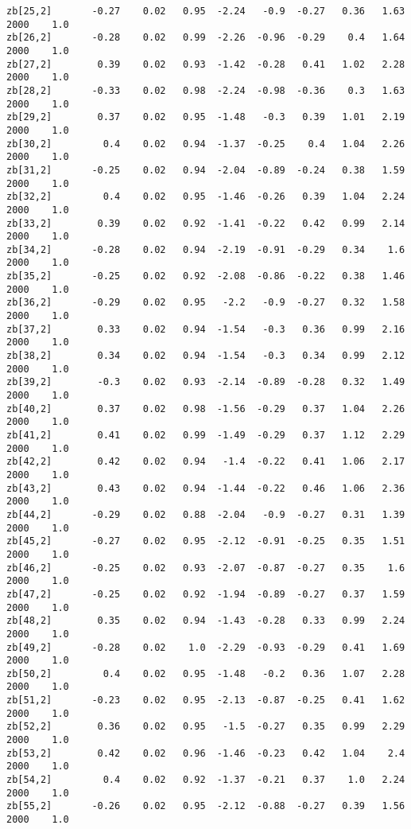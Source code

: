 \documentclass[11pt]{article}
\begin{document}
\begin{Verbatim}[commandchars=\\\{\}]
zb[25,2]       -0.27    0.02   0.95  -2.24   -0.9  -0.27   0.36   1.63   2000    1.0
zb[26,2]       -0.28    0.02   0.99  -2.26  -0.96  -0.29    0.4   1.64   2000    1.0
zb[27,2]        0.39    0.02   0.93  -1.42  -0.28   0.41   1.02   2.28   2000    1.0
zb[28,2]       -0.33    0.02   0.98  -2.24  -0.98  -0.36    0.3   1.63   2000    1.0
zb[29,2]        0.37    0.02   0.95  -1.48   -0.3   0.39   1.01   2.19   2000    1.0
zb[30,2]         0.4    0.02   0.94  -1.37  -0.25    0.4   1.04   2.26   2000    1.0
zb[31,2]       -0.25    0.02   0.94  -2.04  -0.89  -0.24   0.38   1.59   2000    1.0
zb[32,2]         0.4    0.02   0.95  -1.46  -0.26   0.39   1.04   2.24   2000    1.0
zb[33,2]        0.39    0.02   0.92  -1.41  -0.22   0.42   0.99   2.14   2000    1.0
zb[34,2]       -0.28    0.02   0.94  -2.19  -0.91  -0.29   0.34    1.6   2000    1.0
zb[35,2]       -0.25    0.02   0.92  -2.08  -0.86  -0.22   0.38   1.46   2000    1.0
zb[36,2]       -0.29    0.02   0.95   -2.2   -0.9  -0.27   0.32   1.58   2000    1.0
zb[37,2]        0.33    0.02   0.94  -1.54   -0.3   0.36   0.99   2.16   2000    1.0
zb[38,2]        0.34    0.02   0.94  -1.54   -0.3   0.34   0.99   2.12   2000    1.0
zb[39,2]        -0.3    0.02   0.93  -2.14  -0.89  -0.28   0.32   1.49   2000    1.0
zb[40,2]        0.37    0.02   0.98  -1.56  -0.29   0.37   1.04   2.26   2000    1.0
zb[41,2]        0.41    0.02   0.99  -1.49  -0.29   0.37   1.12   2.29   2000    1.0
zb[42,2]        0.42    0.02   0.94   -1.4  -0.22   0.41   1.06   2.17   2000    1.0
zb[43,2]        0.43    0.02   0.94  -1.44  -0.22   0.46   1.06   2.36   2000    1.0
zb[44,2]       -0.29    0.02   0.88  -2.04   -0.9  -0.27   0.31   1.39   2000    1.0
zb[45,2]       -0.27    0.02   0.95  -2.12  -0.91  -0.25   0.35   1.51   2000    1.0
zb[46,2]       -0.25    0.02   0.93  -2.07  -0.87  -0.27   0.35    1.6   2000    1.0
zb[47,2]       -0.25    0.02   0.92  -1.94  -0.89  -0.27   0.37   1.59   2000    1.0
zb[48,2]        0.35    0.02   0.94  -1.43  -0.28   0.33   0.99   2.24   2000    1.0
zb[49,2]       -0.28    0.02    1.0  -2.29  -0.93  -0.29   0.41   1.69   2000    1.0
zb[50,2]         0.4    0.02   0.95  -1.48   -0.2   0.36   1.07   2.28   2000    1.0
zb[51,2]       -0.23    0.02   0.95  -2.13  -0.87  -0.25   0.41   1.62   2000    1.0
zb[52,2]        0.36    0.02   0.95   -1.5  -0.27   0.35   0.99   2.29   2000    1.0
zb[53,2]        0.42    0.02   0.96  -1.46  -0.23   0.42   1.04    2.4   2000    1.0
zb[54,2]         0.4    0.02   0.92  -1.37  -0.21   0.37    1.0   2.24   2000    1.0
zb[55,2]       -0.26    0.02   0.95  -2.12  -0.88  -0.27   0.39   1.56   2000    1.0

\end{Verbatim}
\end{document}
